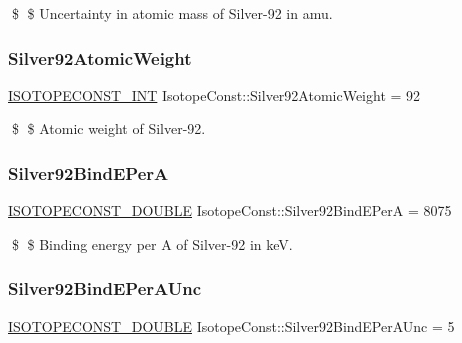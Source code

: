 \$ \$ Uncertainty in atomic mass of Silver-\/92 in amu. \mbox{\label{group___isotope_const-_silver-_ag92_gae501fe37834ecfb6f69042815abe3e1b}} 
\subsubsection{\texorpdfstring{Silver92\+Atomic\+Weight}{Silver92AtomicWeight}}
{\footnotesize\ttfamily \mbox{\hyperlink{group___isotope_const-_macros_ga5f18360b3e99483a35c32d789e62621c}{I\+S\+O\+T\+O\+P\+E\+C\+O\+N\+S\+T\+\_\+\+I\+NT}} Isotope\+Const\+::\+Silver92\+Atomic\+Weight = 92}

\$ \$ Atomic weight of Silver-\/92. \mbox{\label{group___isotope_const-_silver-_ag92_gab6b2c53c52cf293415bc78b9f214c967}} 
\subsubsection{\texorpdfstring{Silver92\+Bind\+E\+PerA}{Silver92BindEPerA}}
{\footnotesize\ttfamily \mbox{\hyperlink{group___isotope_const-_macros_ga8f45a7272ce02c0b4c65c44636ed719a}{I\+S\+O\+T\+O\+P\+E\+C\+O\+N\+S\+T\+\_\+\+D\+O\+U\+B\+LE}} Isotope\+Const\+::\+Silver92\+Bind\+E\+PerA = 8075}

\$ \$ Binding energy per A of Silver-\/92 in keV. \mbox{\label{group___isotope_const-_silver-_ag92_ga44f2547a3675e69c0fb6cded063d67ab}} 
\subsubsection{\texorpdfstring{Silver92\+Bind\+E\+Per\+A\+Unc}{Silver92BindEPerAUnc}}
{\footnotesize\ttfamily \mbox{\hyperlink{group___isotope_const-_macros_ga8f45a7272ce02c0b4c65c44636ed719a}{I\+S\+O\+T\+O\+P\+E\+C\+O\+N\+S\+T\+\_\+\+D\+O\+U\+B\+LE}} Isotope\+Const\+::\+Silver92\+Bind\+E\+Per\+A\+Unc = 5}

